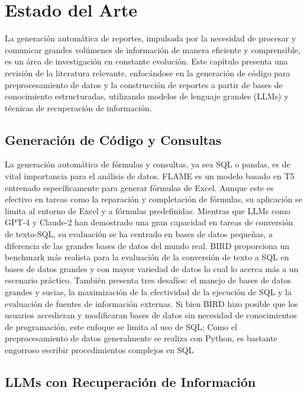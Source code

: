 \chapter{Estado del Arte}\label{chapter:state-of-the-art}

La generación automática de reportes, impulsada por la necesidad de procesar y comunicar grandes volúmenes de información de manera eficiente y comprensible, es un área de investigación en constante evolución. Este capítulo presenta una revisión de la literatura relevante, enfocándose en la generación de código para preprocesamiento de datos y la construcción de reportes a partir de bases de conocimiento estructuradas, utilizando modelos de lenguaje grandes (LLMs) y técnicas de recuperación de información.

\section{Generación de Código y Consultas}

La generación automática de fórmulas y consultas, ya sea SQL o pandas, es de vital importancia para el análisis de datos. FLAME \cite{joshi2024flame} es un modelo basado en T5 entrenado específicamente para generar fórmulas de Excel. Aunque este es efectivo en tareas como la reparación y completación de fórmulas, su aplicación se limita al entorno de Excel y a fórmulas predefinidas. Mientras que LLMs como GPT-4 y Claude-2 han demostrado una gran capacidad en tareas de conversión de texto-SQL, su evaluación se ha centrado en bases de datos pequeñas, a diferencia de las grandes bases de datos del mundo real.
BIRD \cite{li2024can} proporciona un benchmark más realista para la evaluación de la conversión de texto a SQL en bases de datos grandes y con mayor variedad de datos lo cual lo acerca más a un escenario práctico. También presenta tres desafíos: el manejo de bases de datos grandes y sucias, la maximización de la efectividad de la ejecución de SQL y la evaluación de fuentes de información externas. Si bien BIRD hizo posible que los usuarios accedieran y modificaran bases de datos sin necesidad de conocimientos de programación, este enfoque se limita al uso de SQL; Como el preprocesamiento de datos generalmente se realiza con Python, es bastante engorroso escribir procedimientos complejos en SQL

\section{LLMs con Recuperación de Información}

